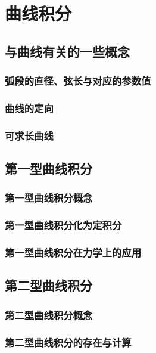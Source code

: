 

\chapter{曲线积分}\label{ch:21}
\section{与曲线有关的一些概念}
\subsection{弧段的直径、弦长与对应的参数值}
\subsection{曲线的定向}
\subsection{可求长曲线}
\begin{exercise}

\end{exercise}
\section{第一型曲线积分}
\subsection{第一型曲线积分概念}
\subsection{第一型曲线积分化为定积分}
\subsection{第一型曲线积分在力学上的应用}
\begin{exercise}

\end{exercise}
\section{第二型曲线积分}
\subsection{第二型曲线积分概念}
\subsection{第二型曲线积分的存在与计算}
